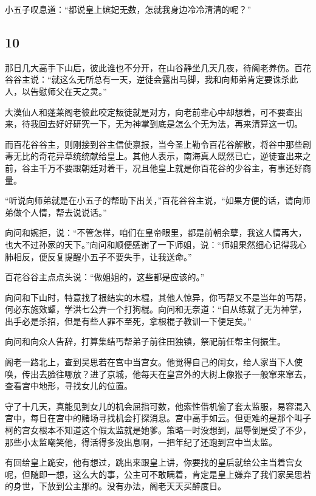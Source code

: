 小五子叹息道：“都说皇上嫔妃无数，怎就我身边冷冷清清的呢？”
\newline

{\centering\subsection{10}}

那日几大高手下山后，彼此谁也不分开，在山谷静坐几天几夜，待阁老养伤。百花谷谷主说：“就这么无所总有一天，逆徒会露出马脚，我和向师弟肯定要诛杀此人，以告慰师父在天之灵。”

大漠仙人和蓬莱阁老彼此咬定叛徒就是对方，向老前辈心中却想着，可不要查出来，待我回去好好研究一下，无为神掌到底是怎么个无为法，再来清算这一切。

而百花谷谷主，则刚接到谷主信使禀报，当今圣上勒令百花谷解散，将谷中那些剧毒无比的奇花异草统统献给皇上。其他人表示，南海真人既然已亡，逆徒查出来之前，谷主千万不要跟朝廷对着干，况且他皇上就是你百花谷的少谷主，有事还好商量。

“听说向师弟就是在小五子的帮助下出关，”百花谷谷主说，“如果方便的话，请向师弟做个人情，帮去说说话。”

向问和婉拒，说：“不管怎样，咱们在皇帝眼里，都是前朝余孽，我这人情再大，也大不过孙家的天下。”向问和顺便感谢了一下师姐，说：“师姐果然细心记得我心肺相反，便反复提醒小五子不要失手，让我送命。”

百花谷谷主点点头说：“做姐姐的，这些都是应该的。”

向问和下山时，特意找了根结实的木棍，其他人惊异，你丐帮又不是当年的丐帮，何必东施效颦，学洪七公弄一个打狗棍。向问和无奈道：“自从练就了无为神掌，出手必是杀招，但是有些人罪不至死，拿根棍子教训一下便足矣。”

向问和向众人告辞，打算集结丐帮弟子前往田独镇，祭祀前任帮主何振生。
\newline

阁老一路北上，查到吴思若在宫中当宫女。他觉得自己的闺女，给人家当下人使唤，传出去脸往哪放？进了京城，他每天在皇宫外的大树上像猴子一般窜来窜去，查看宫中地形，寻找女儿的位置。

守了十几天，真能见到女儿的机会屈指可数，他索性借机偷了套太监服，易容混入宫中，每日在宫中的赌场寻找机会打探消息。宫中高手如云。但更难的是那个叫子柯的宫女根本不知道这个假太监就是她爹。策略一时没想到，屈辱倒是受了不少，那些小太监嘲笑他，得活得多没出息啊，一把年纪了还跑到宫中当太监。

有回给皇上跪安，他有想过，跳出来跟皇上讲，你要找的皇后就给公主当着宫女呢，但随即一想，这么大的事，公主可不敢瞒着，肯定是皇上嫌弃了我们家吴思若的身世，下放到公主那的。没有办法，阁老天天买醉度日。

